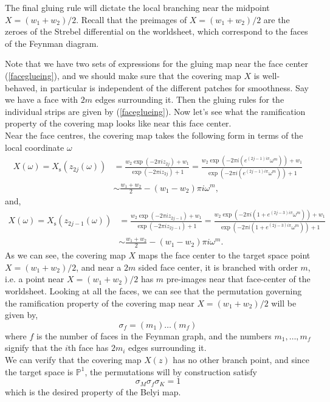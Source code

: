 \documentclass[english]{article}
\newcommand\be{\begin{equation}}
\newcommand\ee{\end{equation}}
\renewcommand{\>}{\rangle}
\newcommand{\<}{\langle}
\newcommand{\w}{\omega}
\renewcommand{\(}{\left(}
\renewcommand{\)}{\right)}
\newcommand{\s}{\sigma}
\begin{document}
The final gluing rule will dictate the local branching near the midpoint $X=(w_1+w_2)/2$. Recall that the preimages of $X=(w_1+w_2)/2$ are the zeroes of the Strebel differential on the worldsheet, which correspond to the faces of the Feynman diagram.


Note that we have two sets of expressions for the gluing map near the face center (\ref{faceglueing}), and we should make sure that the covering map $X$ is well-behaved, in particular is independent of the different patches for smoothness. Say we have a face with $2m$ edges surrounding it. Then the gluing rules for the individual strips are given by (\ref{faceglueing}). Now let's see what the ramification property of the covering map looks like near this face center. \\ 
Near the face centres, the covering map takes the following form in terms of the local coordinate $\w$
\be 
\begin{split}
    X(\w) = X_{\text{s}}(z_{2j}(\w)) &= \frac{w_2\exp({-2\pi i z_{2j}})+w_1}{\exp{(-2\pi i z_{2j})} + 1} =  \frac{w_2\exp({-2\pi i (e^{(2j-1)i\pi}\w^m)})+w_1}{\exp({-2\pi i (e^{(2j-1)i\pi}\w^m)})+1}\\
    & \sim \frac{w_1 + w_2}{2} - ({w_1-w_2})\pi i  \w^m,
\end{split}
\ee 
and,
\be 
\begin{split}
    X(\w) = X_{\text{s}}(z_{2j-1}(\w)) &=\frac{w_2\exp({-2\pi i z_{2j-1}})+w_1}{\exp({-2\pi i z_{2j-1}}) + 1}= \frac{w_2\exp(-2\pi i (1+ e^{(2j-3)i\pi}\w^m))+w_1}{\exp(-2\pi i (1+ e^{(2j-3)i\pi}\w^m)) + 1}\\
    &\sim \frac{w_1 + w_2}{2} - ({w_1-w_2})\pi i  \w^m.
\end{split}
\ee 
As we can see, the covering map $X$ maps the face center to the target space point $X=(w_1 + w_2)/2$, and near a $2m$ sided face center, it is branched with order $m$, i.e. a point near $X=(w_1 + w_2)/2$ has $m$ pre-images near that face-center of the worldsheet. Looking at all the faces, we can see that the permutation governing the ramification property of the covering map near $X=(w_1 + w_2)/2$ will be given by,  
\be 
\s_f = (m_1)\dots(m_f)
\ee 
where $f$ is the number of faces in the Feynman graph, and the numbers $m_1, \dots, m_f$ signify that the $i$th face has $2m_i$ edges surrounding it.\\
We can verify that the covering map $X(z)$ has no other branch point, and since the target space is $\mathbb{P}^1$, the permutations will by construction satisfy 
\be
\s_M \s_f \s_K = 1
\ee 
which is the desired property of the Belyi map.
\end{document}
